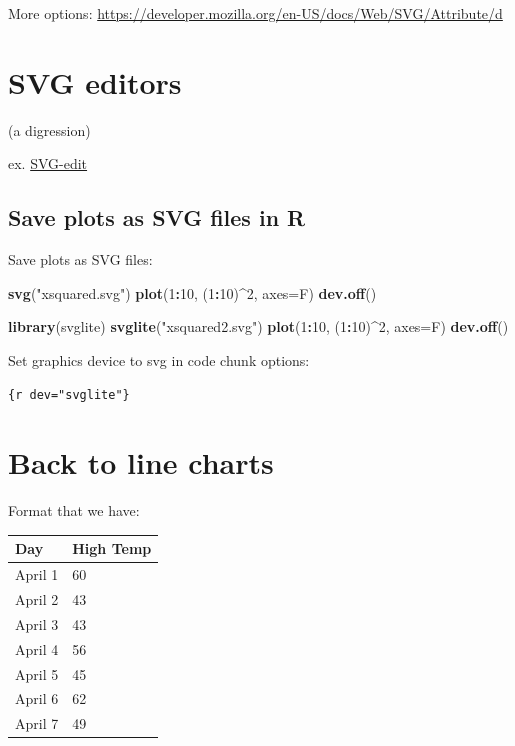 \documentclass[
  openany]{book}
\newenvironment{Shaded}{\begin{snugshade}}{\end{snugshade}}
\newcommand{\DataTypeTok}[1]{\textcolor[rgb]{0.13,0.29,0.53}{#1}}
\newcommand{\DecValTok}[1]{\textcolor[rgb]{0.00,0.00,0.81}{#1}}
\newcommand{\KeywordTok}[1]{\textcolor[rgb]{0.13,0.29,0.53}{\textbf{#1}}}
\newcommand{\NormalTok}[1]{#1}
\newcommand{\OperatorTok}[1]{\textcolor[rgb]{0.81,0.36,0.00}{\textbf{#1}}}
\newcommand{\StringTok}[1]{\textcolor[rgb]{0.31,0.60,0.02}{#1}}
\begin{document}
More options: \url{https://developer.mozilla.org/en-US/docs/Web/SVG/Attribute/d}

\hypertarget{svg-editors}{%
\section{SVG editors}\label{svg-editors}}

(a digression)

ex. \href{https://svg-edit.github.io/svgedit/releases/svg-edit-2.8.1/svg-editor.html}{SVG-edit}

\hypertarget{save-plots-as-svg-files-in-r}{%
\subsection*{Save plots as SVG files in R}\label{save-plots-as-svg-files-in-r}}

Save plots as SVG files:

\begin{Shaded}
\begin{Highlighting}[]
\KeywordTok{svg}\NormalTok{(}\StringTok{"xsquared.svg"}\NormalTok{)}
\KeywordTok{plot}\NormalTok{(}\DecValTok{1}\OperatorTok{:}\DecValTok{10}\NormalTok{, (}\DecValTok{1}\OperatorTok{:}\DecValTok{10}\NormalTok{)}\OperatorTok{\^{}}\DecValTok{2}\NormalTok{, }\DataTypeTok{axes=}\NormalTok{F)}
\KeywordTok{dev.off}\NormalTok{()}

\KeywordTok{library}\NormalTok{(svglite)}
\KeywordTok{svglite}\NormalTok{(}\StringTok{"xsquared2.svg"}\NormalTok{)}
\KeywordTok{plot}\NormalTok{(}\DecValTok{1}\OperatorTok{:}\DecValTok{10}\NormalTok{, (}\DecValTok{1}\OperatorTok{:}\DecValTok{10}\NormalTok{)}\OperatorTok{\^{}}\DecValTok{2}\NormalTok{, }\DataTypeTok{axes=}\NormalTok{F)}
\KeywordTok{dev.off}\NormalTok{()}
\end{Highlighting}
\end{Shaded}

Set graphics device to svg in code
chunk options:

\texttt{\{r\ dev="svglite"\}}

\hypertarget{back-to-line-charts}{%
\section{Back to line charts}\label{back-to-line-charts}}

Format that we have:

\begin{longtable}[]{@{}ll@{}}
\toprule
Day & High Temp\tabularnewline
\midrule
\endhead
April 1 & 60\tabularnewline
April 2 & 43\tabularnewline
April 3 & 43\tabularnewline
April 4 & 56\tabularnewline
April 5 & 45\tabularnewline
April 6 & 62\tabularnewline
April 7 & 49\tabularnewline
\bottomrule
\end{longtable}
\end{document}
